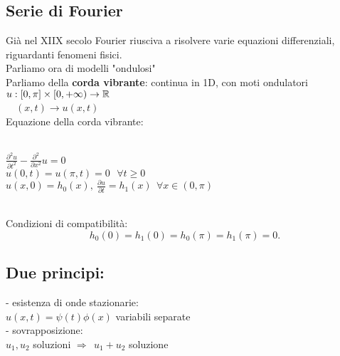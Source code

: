 \documentclass[12px]{article}
\begin{document}
	\subsection{Serie di Fourier}
	Già nel XIIX secolo Fourier riusciva a risolvere varie equazioni differenziali, riguardanti fenomeni fisici.\\
	Parliamo ora di modelli "ondulosi"\\
	Parliamo della \textbf{corda vibrante}: continua in 1D, con moti ondulatori\\
	$u:[0,\pi] \times [0,+\infty)\rightarrow\mathbb{R}$\\
	\text{}\ \ $(x, t) \rightarrow u(x,t)$\\
	Equazione della corda vibrante:
	\begin{cases}\\
		$\frac{\partial ^2 u}{\partial t^2} - \frac{\partial ^2}{\partial x^2}u = 0$\\
	$u(0,t) = u(\pi,t) = 0 \ \ \ \forall t \geq 0$\\
	$u(x,0) = h_0(x), \ \frac{\partial u}{\partial t} = h_1(x) \ \ \forall x\in (0,\pi)$
	\end{cases}\\
	Condizioni di compatibilità:
	\[
	h_0(0) = h_1(0) = h_0(\pi) = h_1(\pi) = 0
	.\] \newpage
	\subsection{Due principi:}
	- esistenza di onde stazionarie:\\
	$u(x,t) = \psi(t)\phi(x)$ variabili separate\\
	- sovrapposizione: \\
	$u_1,u_2$ soluzioni $ \Rightarrow \ \ u_1 + u_2$ soluzione\\
\end{document}
